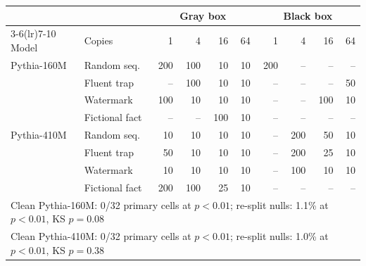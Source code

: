 \begin{tabular}{llrrrrrrrr}
\toprule
 & & \multicolumn{4}{c}{Gray box} & \multicolumn{4}{c}{Black box} \\
\cmidrule(lr){3-6}\cmidrule(lr){7-10}
Model & Copies & 1 & 4 & 16 & 64 & 1 & 4 & 16 & 64 \\
\midrule
Pythia-160M & Random seq. & 200 & 100 & 10 & 10 & 200 & -- & -- & -- \\
 & Fluent trap & -- & 100 & 10 & 10 & -- & -- & -- & 50 \\
 & Watermark & 100 & 10 & 10 & 10 & -- & -- & 100 & 10 \\
 & Fictional fact & -- & -- & 100 & 10 & -- & -- & -- & -- \\
\midrule
Pythia-410M & Random seq. & 10 & 10 & 10 & 10 & -- & 200 & 50 & 10 \\
 & Fluent trap & 50 & 10 & 10 & 10 & -- & 200 & 25 & 10 \\
 & Watermark & 10 & 10 & 10 & 10 & -- & 100 & 10 & 10 \\
 & Fictional fact & 200 & 100 & 25 & 10 & -- & -- & -- & -- \\
\midrule
\multicolumn{10}{l}{Clean Pythia-160M: 0/32 primary cells at $p<0.01$; re-split nulls: 1.1\% at $p<0.01$, KS $p=0.08$} \\
\multicolumn{10}{l}{Clean Pythia-410M: 0/32 primary cells at $p<0.01$; re-split nulls: 1.0\% at $p<0.01$, KS $p=0.38$} \\
\bottomrule
\end{tabular}
